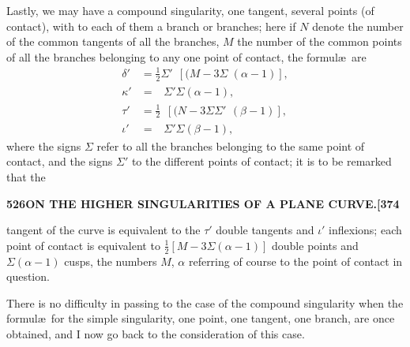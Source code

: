 \documentclass[11pt,a4paper]{article}
\begin{document}
Lastly, we may have a compound singularity, one tangent, several points (of contact), with to each of them a branch or branches; here if $N$ denote the number of the common tangents of all the branches, $M$ the number of the common points of all the branches belonging to any one point of contact, the formul\ae\ are
\begin{align*}
\delta' &= \tfrac{1}{2}\Sigma'\,\phantom{[}[(M - 3\Sigma\phantom{'}(\alpha - 1)],\\
\kappa' &= \phantom{\tfrac{1}{2}[}\Sigma'\Sigma(\alpha - 1),\\
\tau' &= \tfrac{1}{2}\,\phantom{'}[(N - 3\Sigma\Sigma'\phantom{)}(\beta - 1)],\\
\iota' &= \phantom{\tfrac{1}{2}[}\Sigma'\Sigma(\beta - 1),
\end{align*}
where the signs $\Sigma$ refer to all the branches belonging to the same point of contact, and the signs $\Sigma'$ to the different points of contact; it is to be remarked that the

\newpage
\noindent\textbf{526\hspace{1em}ON THE HIGHER SINGULARITIES OF A PLANE CURVE.\hfill[374}

\vspace{12pt}

\noindent
tangent of the curve is equivalent to the $\tau'$ double tangents and $\iota'$ inflexions; each point of contact is equivalent to $\tfrac{1}{2}[M - 3\Sigma(\alpha - 1)]$ double points and $\Sigma(\alpha - 1)$ cusps, the numbers $M$, $\alpha$ referring of course to the point of contact in question.

There is no difficulty in passing to the case of the compound singularity when the formul\ae\ for the simple singularity, one point, one tangent, one branch, are once obtained, and I now go back to the consideration of this case.
\end{document}
